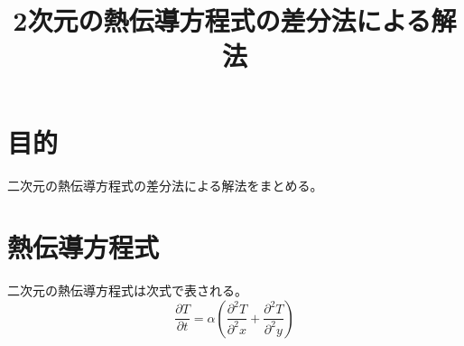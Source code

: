 \documentclass{ujarticle}
\title{2次元の熱伝導方程式の差分法による解法}
\begin{document}
\maketitle
\section{目的}
二次元の熱伝導方程式の差分法による解法をまとめる。
\section{熱伝導方程式}
二次元の熱伝導方程式は次式で表される。
\begin{equation}
\frac{\partial T}{\partial t} = \alpha \left(\frac{\partial^2T}{\partial^2x} + \frac{\partial^2T}{\partial^2y}\right)
\end{equation}
\end{document}
